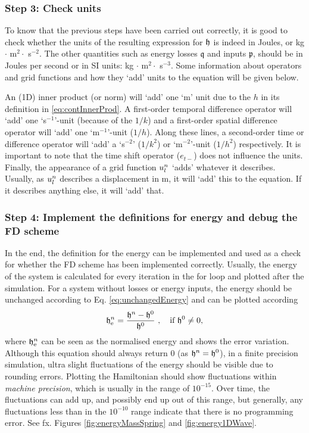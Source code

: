 {{\subsubsection{Step 3: Check units}
To know that the previous steps have been carried out correctly, it is good to check whether the units of the resulting expression for $\mathfrak{h}$ is indeed in Joules, or kg $\cdot$ m$^2 \cdot $ s$^{-2}$. The other quantities such as energy losses $\mathfrak{q}$ and inputs $\mathfrak{p}$, should be in Joules per second or in SI units: kg $\cdot$ m$^2 \cdot $ s$^{-3}$. Some information about operators and grid functions and how they `add' units to the equation will be given below.

An (1D) inner product (or norm) will `add' one `m' unit due to the $h$ in its definition in \eqref{eq:contInnerProd}. A first-order temporal difference operator will `add' one `s$^{-1}$'-unit (because of the $1/k$) and a first-order spatial difference operator will `add' one `m$^{-1}$'-unit ($1/h$). Along these lines, a second-order time or difference operator will `add' a `s$^{-2}$' ($1/k^2$) or `m$^{-2}$'-unit ($1/h^2$) respectively. It is important to note that the time shift operator ($e_{t-}$) does not influence the units. Finally, the appearance of a grid function $u_l^n$ `adds' whatever it describes. Usually, as $u_l^n$ describes a displacement in m, it will `add' this to the equation. If it describes anything else, it will `add' that.

\subsubsection{Step 4: Implement the definitions for energy and debug the FD scheme}
In the end, the definition for the energy can be implemented and used as a check for whether the FD scheme has been implemented correctly. Usually, the energy of the system is calculated for every iteration in the for loop and plotted after the simulation.
For a system without losses or energy inputs, the energy should be unchanged according to Eq. \eqref{eq:unchangedEnergy} and can be plotted according
% 
\begin{equation}\label{eq:normalisedEnergy}
    \mathfrak{h}_{\text{e}}^n = \frac{\mathfrak{h}^n - \mathfrak{h}^0}{\mathfrak{h}^0}\ ,\quad \text{if}\  \mathfrak{h}^0\neq 0,
\end{equation}
% 
where $\mathfrak{h}^n_\text{e}$ can be seen as the normalised energy and shows the error variation. 
Although this equation should always return $0$ (as $\mathfrak{h}^n = \mathfrak{h}^0$), in a finite precision simulation, ultra slight fluctuations of the energy should be visible due to rounding errors. Plotting the Hamiltonian should show fluctuations within \textit{machine precision}, which is usually in the range of $10^{-15}$. Over time, the fluctuations can add up, and possibly end up out of this range, but generally, any fluctuations less than in the $10^{-10}$ range indicate that there is no programming error. See fx. Figures \ref{fig:energyMassSpring} and \ref{fig:energy1DWave}.

}}
